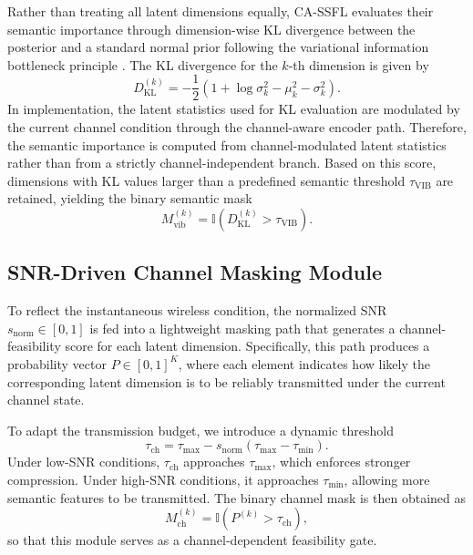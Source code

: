 Rather than treating all latent dimensions equally, CA-SSFL evaluates their semantic importance through dimension-wise KL divergence between the posterior and a standard normal prior following the variational information bottleneck principle \cite{alemi2017deep}. The KL divergence for the $k$-th dimension is given by
\begin{equation}
D_{\mathrm{KL}}^{(k)} = -\frac{1}{2}\left(1 + \log \sigma_k^2 - \mu_k^2 - \sigma_k^2\right).
\end{equation}
In implementation, the latent statistics used for KL evaluation are modulated by the current channel condition through the channel-aware encoder path. Therefore, the semantic importance is computed from channel-modulated latent statistics rather than from a strictly channel-independent branch. Based on this score, dimensions with KL values larger than a predefined semantic threshold $\tau_{\mathrm{VIB}}$ are retained, yielding the binary semantic mask
\begin{equation}
M_{\mathrm{vib}}^{(k)} = \mathbb{I}\left(D_{\mathrm{KL}}^{(k)} > \tau_{\mathrm{VIB}}\right).
\end{equation}

\subsection{SNR-Driven Channel Masking Module}
To reflect the instantaneous wireless condition, the normalized SNR $s_{\mathrm{norm}} \in [0,1]$ is fed into a lightweight masking path that generates a channel-feasibility score for each latent dimension. Specifically, this path produces a probability vector $P \in [0,1]^K$, where each element indicates how likely the corresponding latent dimension is to be reliably transmitted under the current channel state.

To adapt the transmission budget, we introduce a dynamic threshold
\begin{equation}
\tau_{\mathrm{ch}} = \tau_{\max} - s_{\mathrm{norm}}(\tau_{\max}-\tau_{\min}).
\end{equation}
Under low-SNR conditions, $\tau_{\mathrm{ch}}$ approaches $\tau_{\max}$, which enforces stronger compression. Under high-SNR conditions, it approaches $\tau_{\min}$, allowing more semantic features to be transmitted. The binary channel mask is then obtained as
\begin{equation}
M_{\mathrm{ch}}^{(k)} = \mathbb{I}\left(P^{(k)} > \tau_{\mathrm{ch}}\right),
\end{equation}
so that this module serves as a channel-dependent feasibility gate.

